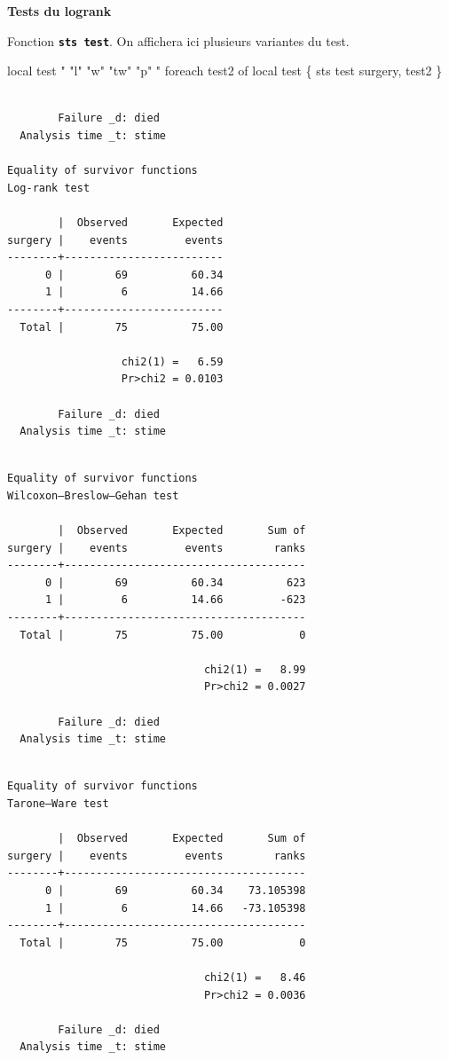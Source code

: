 \documentclass[
  12pt,
  letterpaper,
  DIV=11,
  numbers=noendperiod,
  onepage,
  openany]{scrreprt}
\newenvironment{Shaded}{\begin{snugshade}}{\end{snugshade}}
\newcommand{\KeywordTok}[1]{\textcolor[rgb]{0.94,0.87,0.69}{#1}}
\newcommand{\StringTok}[1]{\textcolor[rgb]{0.80,0.58,0.58}{#1}}
\begin{document}
\textbf{Tests du logrank}

Fonction \textbf{\texttt{sts\ test}}. On affichera ici plusieurs
variantes du test.

\begin{Shaded}
\begin{Highlighting}[]
\KeywordTok{local} \KeywordTok{test} \StringTok{\textasciigrave{}"} \StringTok{"l"} \StringTok{"w"} \StringTok{"tw"} \StringTok{"p"} \StringTok{"\textquotesingle{}}
\StringTok{foreach test2 of local test \{}
\StringTok{sts test surgery, \textasciigrave{}test2\textquotesingle{}}
\StringTok{\}}
\end{Highlighting}
\end{Shaded}

\begin{verbatim}

        Failure _d: died
  Analysis time _t: stime

Equality of survivor functions
Log-rank test

        |  Observed       Expected
surgery |    events         events
--------+-------------------------
      0 |        69          60.34
      1 |         6          14.66
--------+-------------------------
  Total |        75          75.00

                  chi2(1) =   6.59
                  Pr>chi2 = 0.0103

        Failure _d: died
  Analysis time _t: stime
\end{verbatim}

\begin{verbatim}

Equality of survivor functions
Wilcoxon–Breslow–Gehan test

        |  Observed       Expected       Sum of
surgery |    events         events        ranks
--------+--------------------------------------
      0 |        69          60.34          623
      1 |         6          14.66         -623
--------+--------------------------------------
  Total |        75          75.00            0

                               chi2(1) =   8.99
                               Pr>chi2 = 0.0027

        Failure _d: died
  Analysis time _t: stime
\end{verbatim}

\begin{verbatim}

Equality of survivor functions
Tarone–Ware test

        |  Observed       Expected       Sum of
surgery |    events         events        ranks
--------+--------------------------------------
      0 |        69          60.34    73.105398
      1 |         6          14.66   -73.105398
--------+--------------------------------------
  Total |        75          75.00            0

                               chi2(1) =   8.46
                               Pr>chi2 = 0.0036

        Failure _d: died
  Analysis time _t: stime
\end{verbatim}
\end{document}
